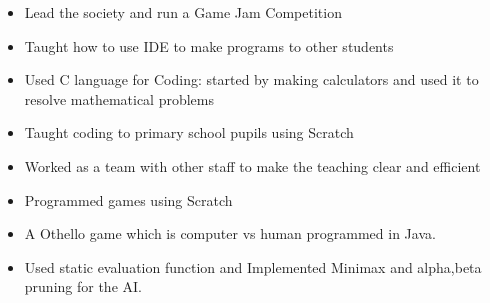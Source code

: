 


 
\vspace{4mm}

\begin{itemize}

\item Lead the society and run a Game Jam Competition
\item Taught how to use IDE to make programs to other students
\item Used C language for Coding: started by making calculators and used it to resolve mathematical problems

\vspace{-3mm}
\end{itemize}

\divider


\begin{itemize}

\item Taught coding to primary school pupils using Scratch
\item Worked as a team with other staff to make the teaching clear and efficient
\item Programmed games using Scratch

\end{itemize}


\vspace{-3mm}


\begin{itemize}

\item A Othello game which is computer vs human programmed in Java.
\item Used static evaluation function and Implemented Minimax and alpha,beta pruning for the AI.

\end{itemize}


